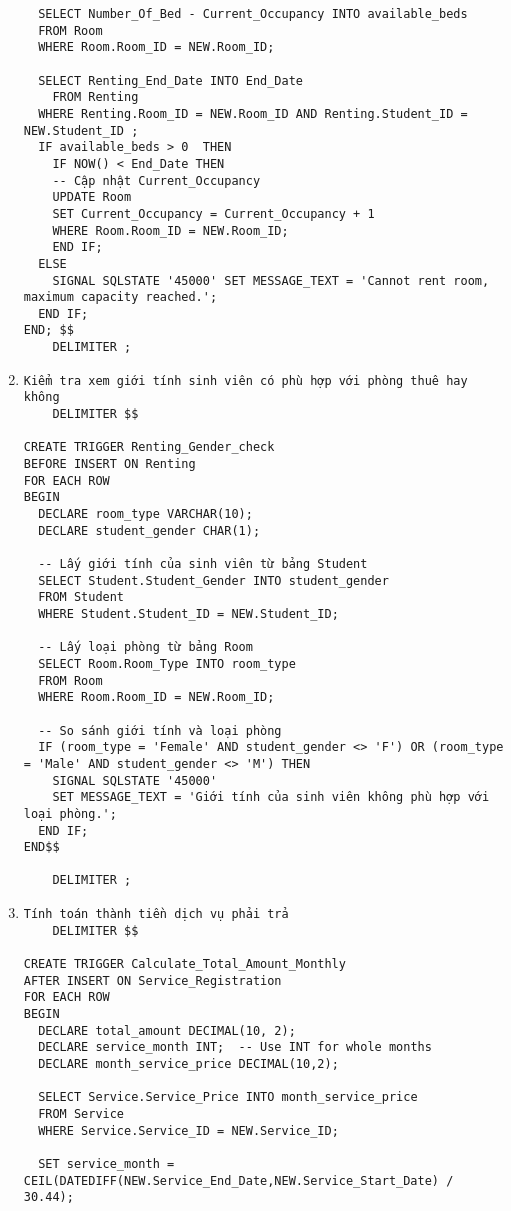\documentclass[a4paper,12pt]{article}
\begin{document}
\begin{enumerate}
\begin{verbatim}
  SELECT Number_Of_Bed - Current_Occupancy INTO available_beds
  FROM Room
  WHERE Room.Room_ID = NEW.Room_ID;
  
  SELECT Renting_End_Date INTO End_Date
	FROM Renting
  WHERE Renting.Room_ID = NEW.Room_ID AND Renting.Student_ID = NEW.Student_ID ;
  IF available_beds > 0  THEN
	IF NOW() < End_Date THEN
    -- Cập nhật Current_Occupancy
    UPDATE Room
    SET Current_Occupancy = Current_Occupancy + 1
    WHERE Room.Room_ID = NEW.Room_ID;
    END IF;
  ELSE
    SIGNAL SQLSTATE '45000' SET MESSAGE_TEXT = 'Cannot rent room, maximum capacity reached.';
  END IF;
END; $$
    DELIMITER ;
    \end{verbatim}
    \item \begin{verbatim}
Kiểm tra xem giới tính sinh viên có phù hợp với phòng thuê hay không
    DELIMITER $$

CREATE TRIGGER Renting_Gender_check
BEFORE INSERT ON Renting
FOR EACH ROW
BEGIN
  DECLARE room_type VARCHAR(10);
  DECLARE student_gender CHAR(1);

  -- Lấy giới tính của sinh viên từ bảng Student
  SELECT Student.Student_Gender INTO student_gender
  FROM Student
  WHERE Student.Student_ID = NEW.Student_ID;

  -- Lấy loại phòng từ bảng Room
  SELECT Room.Room_Type INTO room_type
  FROM Room
  WHERE Room.Room_ID = NEW.Room_ID;

  -- So sánh giới tính và loại phòng
  IF (room_type = 'Female' AND student_gender <> 'F') OR (room_type = 'Male' AND student_gender <> 'M') THEN
    SIGNAL SQLSTATE '45000'
    SET MESSAGE_TEXT = 'Giới tính của sinh viên không phù hợp với loại phòng.';
  END IF;
END$$

    DELIMITER ;
    \end{verbatim}
    \item \begin{verbatim}
Tính toán thành tiền dịch vụ phải trả
    DELIMITER $$

CREATE TRIGGER Calculate_Total_Amount_Monthly
AFTER INSERT ON Service_Registration
FOR EACH ROW
BEGIN
  DECLARE total_amount DECIMAL(10, 2);
  DECLARE service_month INT;  -- Use INT for whole months
  DECLARE month_service_price DECIMAL(10,2);

  SELECT Service.Service_Price INTO month_service_price
  FROM Service
  WHERE Service.Service_ID = NEW.Service_ID;

  SET service_month = CEIL(DATEDIFF(NEW.Service_End_Date,NEW.Service_Start_Date) / 30.44);


\end{verbatim}
\end{enumerate}
\end{document}
